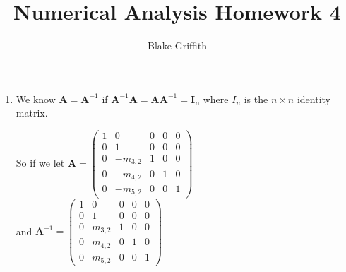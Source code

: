 \documentclass[a4paper]{article}
\title{Numerical Analysis Homework 4}
\author{Blake Griffith}
\begin{document}
\maketitle
\begin{enumerate}
	\item
		We know \( \mathbf{A} = \mathbf{A}^{-1}\) if \( \mathbf{A}^{-1} \mathbf{A} = \mathbf{A} \mathbf{A}^{-1} = \mathbf{I_n} \) where \( I_n \) is the \( n \times n \) identity matrix.\\
		\begin{center}
		So if we let 
		\( \mathbf{A} = 
		\left( \begin{array}{ccccc}
			1 & 0 & 0 & 0 & 0 \\
			0 & 1 & 0 & 0 & 0 \\
			0 & -m_{3,2} & 1 & 0 & 0 \\
			0 & -m_{4,2} & 0 & 1 & 0 \\
			0 & -m_{5,2} & 0 & 0 & 1 
		\end{array} \right) \)\\ 
		and \( \mathbf{A}^{-1} = 
		\left( \begin{array}{ccccc}
			1 & 0 & 0 & 0 & 0 \\
			0 & 1 & 0 & 0 & 0 \\
			0 & m_{3,2} & 1 & 0 & 0 \\
			0 & m_{4,2} & 0 & 1 & 0 \\
			0 & m_{5,2} & 0 & 0 & 1 
		\end{array} \right) \) 
		\end{center}


\end{enumerate}
\end{document}
